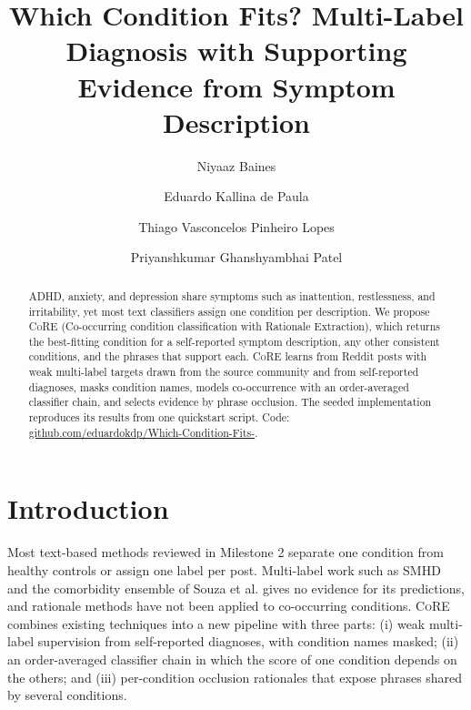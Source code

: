 \documentclass[sigconf]{acmart}
\newcommand{\core}{\textsc{CoRE}}
\begin{document}
\title{Which Condition Fits? Multi-Label Diagnosis with Supporting Evidence from Symptom Description}

\author{Niyaaz Baines}
\author{Eduardo Kallina de Paula}
\author{Thiago Vasconcelos Pinheiro Lopes}
\author{Priyanshkumar Ghanshyambhai Patel}

\renewcommand{\shortauthors}{Baines, Kallina de Paula, Lopes, and Patel}

\begin{abstract}
ADHD, anxiety, and depression share symptoms such as inattention, restlessness, and irritability, yet most text classifiers assign one condition per description. We propose \core{} (Co-occurring condition classification with Rationale Extraction), which returns the best-fitting condition for a self-reported symptom description, any other consistent conditions, and the phrases that support each. \core{} learns from Reddit posts with weak multi-label targets drawn from the source community and from self-reported diagnoses, masks condition names, models co-occurrence with an order-averaged classifier chain, and selects evidence by phrase occlusion. The seeded implementation reproduces its results from one quickstart script. Code: \href{https://github.com/eduardokdp/Which-Condition-Fits-}{github.com/eduardokdp/\allowbreak Which-Condition-Fits-}.
\end{abstract}


\maketitle
\pagestyle{plain}

\section{Introduction}
Most text-based methods reviewed in Milestone 2 separate one condition from healthy controls or assign one label per post. Multi-label work such as SMHD \cite{cohan2018smhd} and the comorbidity ensemble of Souza et al. \cite{souza2021deep} gives no evidence for its predictions, and rationale methods \cite{lei2016rationalizing, deyoung2020eraser} have not been applied to co-occurring conditions. \core{} combines existing techniques into a new pipeline with three parts: (i) weak multi-label supervision from self-reported diagnoses, with condition names masked; (ii) an order-averaged classifier chain in which the score of one condition depends on the others; and (iii) per-condition occlusion rationales that expose phrases shared by several conditions.
\end{document}

